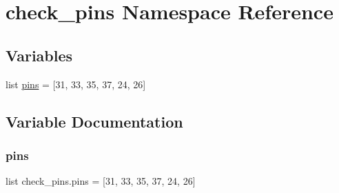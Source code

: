 \hypertarget{namespacecheck__pins}{}\section{check\+\_\+pins Namespace Reference}
\label{namespacecheck__pins}
\subsection*{Variables}
\begin{DoxyCompactItemize}
\item 
list \mbox{\hyperlink{namespacecheck__pins_ae7e56ca97a6e158edc4836330a89f5bb}{pins}} = \mbox{[}31, 33, 35, 37, 24, 26\mbox{]}
\end{DoxyCompactItemize}


\subsection{Variable Documentation}
\mbox{\label{namespacecheck__pins_ae7e56ca97a6e158edc4836330a89f5bb}} 
\subsubsection{\texorpdfstring{pins}{pins}}
{\footnotesize\ttfamily list check\+\_\+pins.\+pins = \mbox{[}31, 33, 35, 37, 24, 26\mbox{]}}

